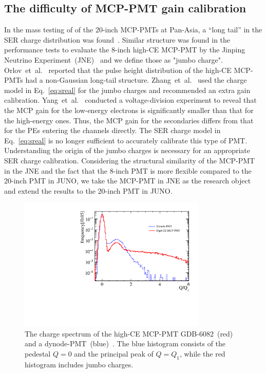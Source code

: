 \subsection{The difficulty of MCP-PMT gain calibration}
In the mass testing of of the 20-inch MCP-PMTs at Pan-Asia, a ``long tail'' in the SER charge distribution was found~\cite{JUNO:2022hlz}. Similar structure was found in the performance tests to evaluate the 8-inch high-CE MCP-PMT by the Jinping Neutrino Experiment~(JNE)~\cite{Zhang:2023ued} and we define those as "jumbo charge".
Orlov~et~al.~\cite{reviewer1} reported that the pulse height distribution of the high-CE MCP-PMTs had a non-Gaussian long-tail structure. Zhang~et~al.~\cite{2021Gain} used the charge model in Eq.~\eqref{eq:sreal} for the jumbo charges and recommended an extra gain calibration. Yang~et~al.~\cite{2017MCP} conducted a voltage-division experiment to reveal that the MCP gain for the low-energy electrons is significantly smaller than that for the high-energy ones.
Thus, the MCP gain for the secondaries differs from that for the PEs entering the channels directly.
The SER charge model in Eq.~\eqref{eq:sreal} is no longer sufficient to accurately calibrate this type of PMT.
Understanding the origin of the jumbo charges is necessary for an appropriate SER charge calibration.
Considering the structural similarity of the MCP-PMT in the JNE and the fact that the 8-inch PMT is more flexible compared to the 20-inch PMT in JUNO, we take the MCP-PMT in JNE as the research object and extend the results to the 20-inch PMT in JUNO.
\begin{figure}[!htbp]
	\centering
	\includegraphics[width=0.8\textwidth]{PMTRelated/GTmodel/spe.pdf}
	\caption{The charge spectrum of the high-CE MCP-PMT GDB-6082~(red) and a dynode-PMT~(blue)~\cite{Zhang:2023ued}.
		The blue histogram consists of the pedestal $Q=0$ and the principal peak of $Q=Q_1$, while the red histogram includes jumbo charges.}
	\label{fig:spe_sreal}
\end{figure}

